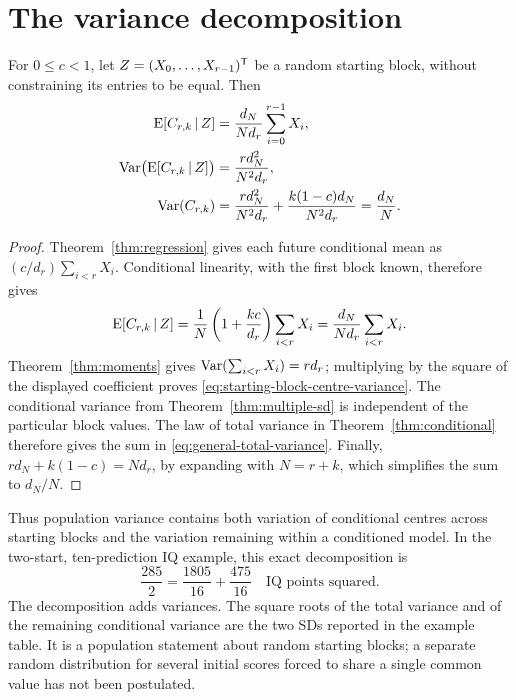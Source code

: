 \section{The variance decomposition}
\begin{proposition}
\label{prop:variance-components-general}
For \(0\leq c<1\), let \(Z=(X_0,\ldots,X_{r-1})^{\mathsf{T}}\) be a random
starting block, without constraining its entries to be equal. Then
\begin{align}
 \operatorname{E}[C_{r,k}\,\vert\, Z]
  &=\frac{d_N}{N d_r}\sum_{i=0}^{r-1}X_i,
    \label{eq:random-starting-block-centre}\\
 \operatorname{Var}\bigl(\operatorname{E}[C_{r,k}\,\vert\, Z]\bigr)
  &=\frac{r d_N^2}{N^2d_r},
    \label{eq:starting-block-centre-variance}\\
 \operatorname{Var}(C_{r,k})
  &=\frac{r d_N^2}{N^2d_r}
    +\frac{k(1-c)d_N}{N^2d_r}
   =\frac{d_N}{N}.
    \label{eq:general-total-variance}
\end{align}
\end{proposition}
\begin{proof}
Theorem~\ref{thm:regression} gives each future conditional mean as
\((c/d_r)\sum_{i<r}X_i\). Conditional linearity, with the first block
known, therefore gives
\[
 \operatorname{E}[C_{r,k}\,\vert\, Z]
 =\frac1N\left(1+\frac{kc}{d_r}\right)\sum_{i<r}X_i
 =\frac{d_N}{N d_r}\sum_{i<r}X_i.
\]
Theorem~\ref{thm:moments} gives
\(\operatorname{Var}(\sum_{i<r}X_i)=r d_r\); multiplying by the square of the
displayed coefficient proves
\eqref{eq:starting-block-centre-variance}. The conditional variance from
Theorem~\ref{thm:multiple-sd} is independent of the particular block
values. The law of total variance in Theorem~\ref{thm:conditional}
therefore gives the sum in \eqref{eq:general-total-variance}.
Finally,
\(r d_N+k(1-c)=N d_r\), by expanding with \(N=r+k\), which simplifies
the sum to \(d_N/N\).
\end{proof}

Thus population variance contains both variation of conditional centres
across starting blocks and the variation remaining within a conditioned
model. In the two-start, ten-prediction IQ example, this exact decomposition
is
\[
 \frac{285}{2}=\frac{1805}{16}+\frac{475}{16}
 \quad\text{IQ points squared}.
\]
The decomposition adds variances. The square roots of the total variance
and of the remaining conditional variance are the two SDs reported in the
example table. It is a population statement about random starting
blocks; a separate random distribution for several initial scores forced
to share a single common value has not been postulated.

